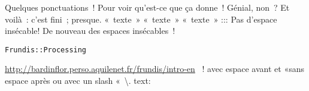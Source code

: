 Quelques ponctuations~! Pour voir qu'est-ce que ça donne~! Génial, non~?
Et voilà~: c'est fini~; presque. 
«~texte~»
«~texte~»
«~texte~»
:::
Pas d'espace insécable!
De nouveau des espaces insécables~!

\begin{verbatim}
Frundis::Processing
\end{verbatim}
\url{http://bardinflor.perso.aquilenet.fr/frundis/intro-en}
~! avec espace avant et «sans espace après ou avec un slash «~\textbackslash{}.
text:

